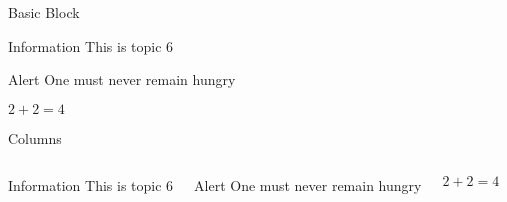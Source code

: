 \documentclass{beamer}
\begin{document}
	
	\begin{frame}{Basic Block}
		\begin{block}{Information}
			This is topic 6
		\end{block}
	
		\begin{alertblock}{Alert}
			One must never remain hungry
		\end{alertblock}
	
		\begin{example}
			$ 2 + 2 = 4 $
		\end{example}
		
	\end{frame}
	
	\begin{frame}{Columns}
		
		\begin{columns}
			
			\begin{block}{Information}
				This is topic 6
			\end{block}
		
			\begin{alertblock}{Alert}
				One must never remain hungry
			\end{alertblock}
			
			\begin{example}
				$ 2 + 2 = 4 $
			\end{example}
		
		\end{columns}
		
	\end{frame}
	
\end{document}
